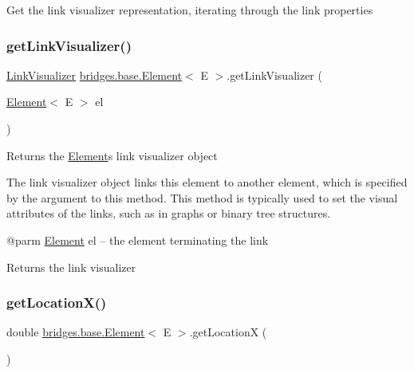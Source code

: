 Get the link visualizer representation, iterating through the link properties \mbox{\label{classbridges_1_1base_1_1_element_a7978552c7b36e28c302f611fc1958e7f}} 
\subsubsection{\texorpdfstring{getLinkVisualizer()}{getLinkVisualizer()}}
{\footnotesize\ttfamily \mbox{\hyperlink{classbridges_1_1base_1_1_link_visualizer}{Link\+Visualizer}} \mbox{\hyperlink{classbridges_1_1base_1_1_element}{bridges.\+base.\+Element}}$<$ E $>$.get\+Link\+Visualizer (\begin{DoxyParamCaption}\item[{\mbox{\hyperlink{classbridges_1_1base_1_1_element}{Element}}$<$ E $>$}]{el }\end{DoxyParamCaption})}

Returns the \mbox{\hyperlink{classbridges_1_1base_1_1_element}{Element}}\textquotesingle{}s link visualizer object

The link visualizer object links this element to another element, which is specified by the argument to this method. This method is typically used to set the visual attributes of the links, such as in graphs or binary tree structures.

@parm \mbox{\hyperlink{classbridges_1_1base_1_1_element}{Element}} el -- the element terminating the link

\begin{DoxyReturn}{Returns}
the link visualizer 
\end{DoxyReturn}
\mbox{\label{classbridges_1_1base_1_1_element_a57cc1611e0d9cbec9da30d1cdcd3b23d}} 
\subsubsection{\texorpdfstring{getLocationX()}{getLocationX()}}
{\footnotesize\ttfamily double \mbox{\hyperlink{classbridges_1_1base_1_1_element}{bridges.\+base.\+Element}}$<$ E $>$.get\+LocationX (\begin{DoxyParamCaption}{ }\end{DoxyParamCaption})}

